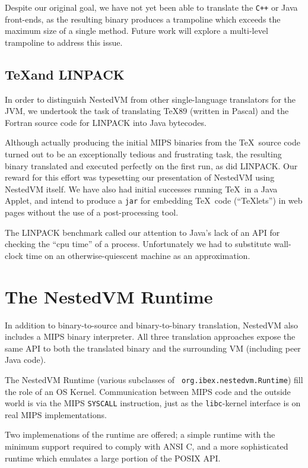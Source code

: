 \documentclass{acmconf}
\begin{document}
Despite our original goal, we have not yet been able to translate the
{\tt C++} or Java front-ends, as the resulting binary produces a
trampoline which exceeds the maximum size of a single method.  Future
work will explore a multi-level trampoline to address this issue.



\subsection{\TeX and LINPACK}

In order to distinguish NestedVM from other single-language
translators for the JVM, we undertook the task of translating \TeX 89
(written in Pascal) and the Fortran source code for LINPACK into Java
bytecodes.

Although actually producing the initial MIPS binaries from the \TeX\
source code turned out to be an exceptionally tedious and frustrating
task, the resulting binary translated and executed perfectly on the
first run, as did LINPACK.  Our reward for this effort was typesetting
our presentation of NestedVM using NestedVM itself.  We have also had
initial successes running \TeX\ in a Java Applet, and intend to
produce a {\tt jar} for embedding \TeX\ code (``\TeX lets'') in web
pages without the use of a post-processing tool.

The LINPACK benchmark called our attention to Java's lack of an API
for checking the ``cpu time'' of a process.  Unfortunately we had to
substitute wall-clock time on an otherwise-quiescent machine as an
approximation.



\section{The NestedVM Runtime}

In addition to binary-to-source and binary-to-binary translation,
NestedVM also includes a MIPS binary interpreter.  All three
translation approaches expose the same API to both the translated
binary and the surrounding VM (including peer Java code).

The NestedVM Runtime (various subclasses of {\tt
org.ibex.nestedvm.Runtime}) fill the role of an OS Kernel.
Communication between MIPS code and the outside world is via the MIPS
{\tt SYSCALL} instruction, just as the {\tt libc}-kernel interface is
on real MIPS implementations.

Two implemenations of the runtime are offered; a simple runtime with
the minimum support required to comply with ANSI C, and a more
sophisticated runtime which emulates a large portion of the POSIX API.
\end{document}
